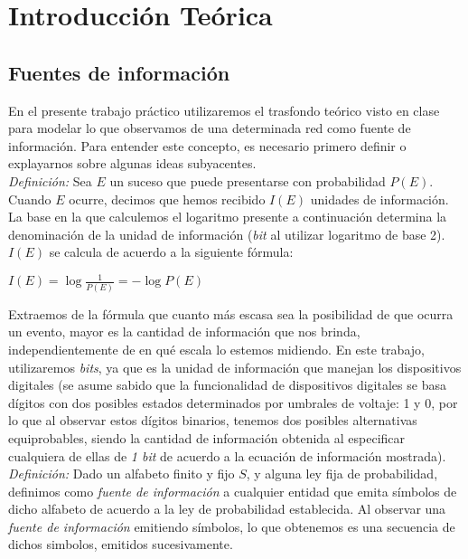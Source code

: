 \section{Introducción Teórica}

\subsection{Fuentes de información}

En el presente trabajo práctico utilizaremos el trasfondo teórico visto en clase para modelar lo que
observamos de una determinada red como fuente de información. Para entender este concepto,
es necesario primero definir o explayarnos sobre algunas ideas subyacentes.\\

\emph{Definición:} Sea $E$ un suceso que puede presentarse con probabilidad $P(E)$. Cuando $E$ ocurre,
decimos que hemos recibido $I(E)$ unidades de información. La base en la que calculemos el logaritmo presente
a continuación determina la denominación de la unidad de información (\emph{bit} al utilizar logaritmo de base 2).
$I(E)$ se calcula de acuerdo a la siguiente fórmula:

\begin{center}
\begin{math}
I(E) = \log{\frac{1}{P(E)}} = -\log{P(E)}
\end{math}
\end{center}

Extraemos de la fórmula que cuanto más escasa sea la posibilidad de que ocurra un evento, mayor es la cantidad de 
información que nos brinda, independientemente de en qué escala lo estemos midiendo. En este trabajo, utilizaremos
\emph{bits}, ya que es la unidad de información que manejan los dispositivos digitales (se asume sabido que la funcionalidad
de dispositivos digitales se basa dígitos con dos posibles estados determinados por umbrales de voltaje: 1 y 0, por lo que al observar
estos dígitos binarios, tenemos dos posibles alternativas equiprobables, siendo la cantidad de información obtenida al
especificar cualquiera de ellas de \emph{1 bit} de acuerdo a la ecuación de información mostrada).\\

\emph{Definición:} Dado un alfabeto finito y fijo $S$, y alguna ley fija de probabilidad, definimos como \emph{fuente de información} a cualquier entidad que emita símbolos de dicho alfabeto de acuerdo a la ley de probabilidad establecida. Al
observar una \emph{fuente de información} emitiendo símbolos, lo que obtenemos es una secuencia de dichos simbolos,
emitidos sucesivamente.\\ 

